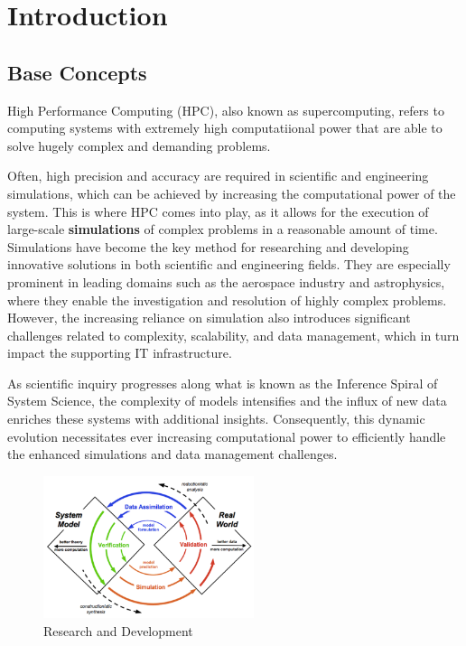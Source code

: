 \chapter{Introduction}

\section{Base Concepts} \label{sec:base_concepts}

High Performance Computing (HPC), also known as supercomputing, refers to computing systems with extremely high computatiional power that are able to solve hugely complex and demanding problems. \cite{europaHighPerformance}

Often, high precision and accuracy are required in scientific and engineering simulations, which can be achieved by increasing the computational power of the system. This is where HPC comes into play, as it allows for the execution of large-scale \textbf{simulations} of complex problems in a reasonable amount of time. Simulations have become the key method for researching and developing innovative solutions in both scientific and engineering fields. They are especially prominent in leading domains such as the aerospace industry and astrophysics, where they enable the investigation and resolution of highly complex problems. However, the increasing reliance on simulation also introduces significant challenges related to complexity, scalability, and data management, which in turn impact the supporting IT infrastructure.

As scientific inquiry progresses along what is known as the Inference Spiral of System Science, the complexity of models intensifies and the influx of new data enriches these systems with additional insights. Consequently, this dynamic evolution necessitates ever increasing computational power to efficiently handle the enhanced simulations and data management challenges.

\begin{figure}[H]
    \centering
    \includegraphics[width=0.55\textwidth]{assets/fig1.png}
    \caption{Research and Development}
    \label{fig:research}
\end{figure}

